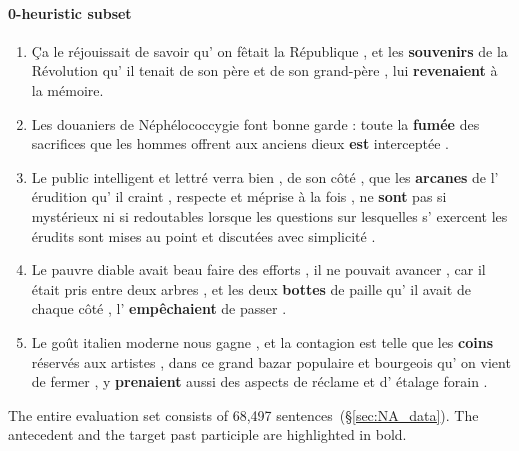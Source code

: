 \paragraph{0-heuristic subset}
\begin{enumerate}[itemsep=0pt,label=\arabic*).]
\item Ça le réjouissait de savoir qu' on fêtait la République , et les \textbf{souvenirs} de la Révolution qu' il tenait de son père et de son grand-père , lui \textbf{revenaient} à la mémoire.
\item Les douaniers de Néphélococcygie font bonne garde : toute la \textbf{fumée} des sacrifices que les hommes offrent aux anciens dieux \textbf{est} interceptée .
\item Le public intelligent et lettré verra bien , de son côté , que les \textbf{arcanes} de l' érudition qu' il craint , respecte et méprise à la fois , ne \textbf{sont} pas si mystérieux ni si redoutables lorsque les questions sur lesquelles s' exercent les érudits sont mises au point et discutées avec simplicité .
\item Le pauvre diable avait beau faire des efforts , il ne pouvait avancer , car il était pris entre deux arbres , et les deux \textbf{bottes} de paille qu' il avait de chaque côté , l' \textbf{empêchaient} de passer .
\item Le goût italien moderne nous gagne , et la contagion est telle que les \textbf{coins} réservés aux artistes , dans ce grand bazar populaire et bourgeois qu' on vient de fermer , y \textbf{prenaient} aussi des aspects de réclame et d' étalage forain .
\end{enumerate}


The entire evaluation set consists of 68,497 sentences~(\S\ref{sec:NA_data}). The antecedent and the target past participle are highlighted in bold. 
